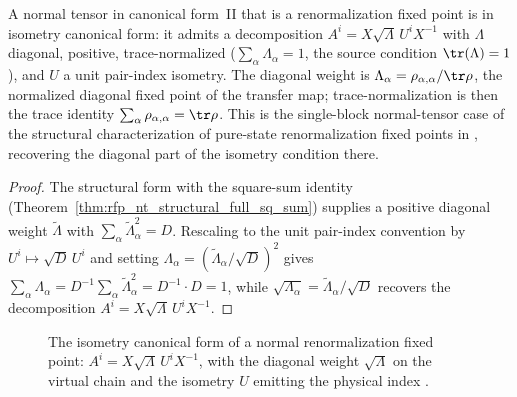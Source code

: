 \begin{theorem}%
    \label{thm:isometry_canonical_form_of_rfp_nt}
    \leanok
    A normal tensor in canonical form~II that is a renormalization fixed point
    is in isometry canonical form: it admits a decomposition
    $A^i = X\sqrt\Lambda\,U^i X^{-1}$ with $\Lambda$ diagonal, positive,
    trace-normalized ($\sum_\alpha \Lambda_\alpha = 1$, the source condition
    $\tr(\Lambda)=1$), and $U$ a unit pair-index isometry.  The diagonal weight
    is $\Lambda_\alpha = \rho_{\alpha,\alpha}/\tr\rho$, the normalized diagonal
    fixed point of the transfer map; trace-normalization is then the trace
    identity $\sum_\alpha \rho_{\alpha,\alpha} = \tr\rho$.  This is the
    single-block normal-tensor case of the structural characterization of
    pure-state renormalization fixed points in
    \cite[Section~3]{Cirac2016MPDO_arXiv}, recovering the diagonal part of the
    isometry condition there.
\end{theorem}
\begin{proof}\leanok
    The structural form with the square-sum identity
    (Theorem~\ref{thm:rfp_nt_structural_full_sq_sum}) supplies a positive
    diagonal weight $\widetilde\Lambda$ with
    $\sum_\alpha \widetilde\Lambda_\alpha^2 = D$.  Rescaling to the unit
    pair-index convention by $U^i\mapsto\sqrt D\,U^i$ and setting
    $\Lambda_\alpha=(\widetilde\Lambda_\alpha/\sqrt D)^2$ gives
    $\sum_\alpha \Lambda_\alpha = D^{-1}\sum_\alpha \widetilde\Lambda_\alpha^2
    = D^{-1}\cdot D = 1$, while
    $\sqrt{\Lambda_\alpha}=\widetilde\Lambda_\alpha/\sqrt D$ recovers the
    decomposition $A^i = X\sqrt\Lambda\,U^i X^{-1}$.
\end{proof}

\begin{figure}[ht]
    \centering
    \TNRFPIsometryCanonicalForm
    \caption{The isometry canonical form of a normal renormalization fixed
        point: $A^i = X\sqrt\Lambda\,U^i X^{-1}$, with the diagonal weight
        $\sqrt\Lambda$ on the virtual chain and the isometry $U$ emitting the
        physical index
        \cite[Appendix~B, lines~1275--1289]{Cirac2016MPDO_arXiv}.}
    \label{fig:rfp_isometry_canonical_form}
\end{figure}

